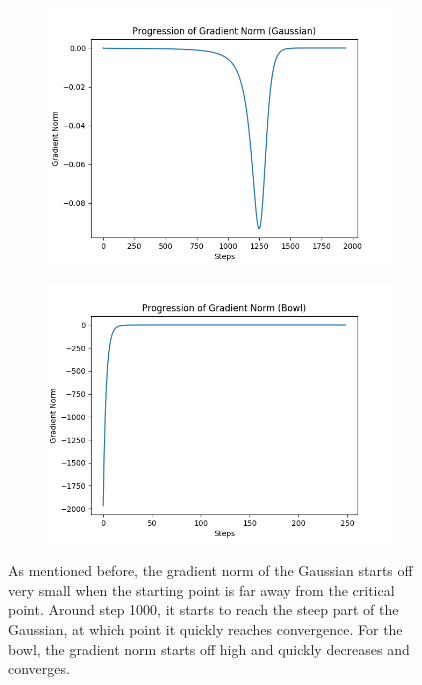 \documentclass{article}
\begin{document}
\begin{figure}[H]
        \begin{subfigure}[b]{0.5\textwidth}
                \includegraphics[width=\linewidth]{../P1/figs/grad_norm_gauss.png}
        \end{subfigure}%
        \begin{subfigure}[b]{0.5\textwidth}
                \includegraphics[width=\linewidth]{../P1/figs/grad_norm_bowl.png}
        \end{subfigure}%
\caption*{As mentioned before, the gradient norm of the Gaussian starts off very small when the starting point is far away from the critical point. Around step 1000, it starts to reach the steep part of the Gaussian, at which point it quickly reaches convergence. For the bowl, the gradient norm starts off high and quickly decreases and converges.}
\end{figure}
\end{document}
